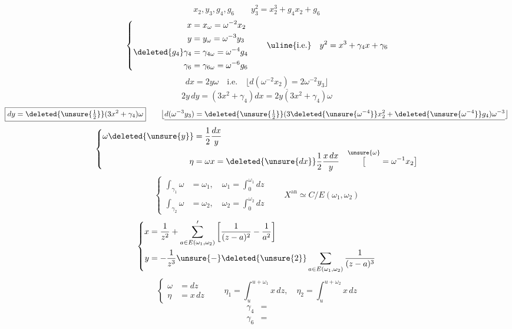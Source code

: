 \[
x_2,y_3,g_4,g_6\qquad \boxed{y_3^2=x_2^3+g_4x_2+g_6}
\]
\[
\left\{\begin{aligned}
x&=x_{\omega}=\omega^{-2}x_2\\
y&=y_{\omega}=\omega^{-3}y_3\\
\deleted{g_4}\gamma_4&=\gamma_{4\omega}=\omega^{-4}g_4\\
\gamma_6&=\gamma_{6\omega}=\omega^{-6}g_6
\end{aligned}\right.
\qquad\text{\uline{i.e.}}\quad y^2=x^3+\gamma_4x+\gamma_6
\]
\[
\boxed{dx=2y\omega}\quad\text{i.e.}\quad
\bigl\lfloor\underline{d(\omega^{-2}x_2)=2\omega^{-2}y_3}\bigr\rfloor
\]
\[
2y\,dy=(3x^2+\gamma_4)dx=2y(3x^2+\gamma_4)\omega
\]
\[
\boxed{dy=\deleted{\unsure{\tfrac12}}(3x^2+\gamma_4)\omega}\qquad
\bigl\lfloor\underline{d(\omega^{-3}y_3)=\deleted{\unsure{\tfrac12}}(3\deleted{\unsure{\omega^{-4}}}x_2^2+
\deleted{\unsure{\omega^{-4}}}g_4)\omega^{-3}}\bigr\rfloor
\]
\[
\left\{\begin{aligned}
\omega\deleted{\unsure{y}}&=\frac12\frac{dx}{y}\\
\eta&=\omega x=\deleted{\unsure{dx}}\frac12\frac{x\,dx}{y}
\quad\overset{\unsure{\omega}}{\bigl[}=\omega^{-1}x_2\bigr]
\end{aligned}\right.
\]
\[
\left\{\begin{aligned}
\int_{\gamma_1}\omega&=\omega_1,\quad \omega_1=\int_0^{\omega_1}dz\\
\int_{\gamma_2}\omega&=\omega_2,\quad \omega_2=\int_0^{\omega_2}dz
\end{aligned}\right.
\qquad X^{\mathrm{an}}\simeq C/E(\omega_1,\omega_2)
\]
\[
\left\{\begin{aligned}
x&=\frac1{z^2}+\sum_{a\in E(\omega_1,\omega_2)}'\left[\frac1{(z-a)^2}-\frac1{a^2}\right]\\
y&=-\frac1{z^3}\unsure{-}\deleted{\unsure{2}}\sum_{a\in E(\omega_1,\omega_2)}\frac1{(z-a)^3}
\end{aligned}\right.
\]
\[
\left\{\begin{aligned}
\omega&=dz\\
\eta&=x\,dz
\end{aligned}\right.
\qquad\eta_1=\int_u^{u+\omega_1}x\,dz,\quad
\eta_2=\int_u^{u+\omega_2}x\,dz
\]
\[
\begin{aligned}
\gamma_4&=\\
\gamma_6&=
\end{aligned}
\]

